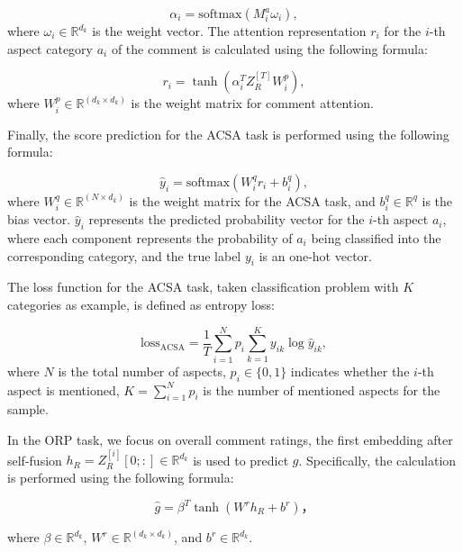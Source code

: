\documentclass[preprint,12pt]{elsarticle}
\begin{document}
\begin{equation}
\alpha_i = \text{softmax}(M_i^a \omega_i),
\end{equation}
where $\omega_i \in \mathbb{R}^{d_k}$ is the weight vector. The attention representation $r_i$ for the $i$-th aspect category $a_i$ of the comment is calculated using the following formula:

\begin{equation}
r_i = \tanh\left(\alpha_i^T Z_R^{[T]} W_i^p\right),
\end{equation}
where $W_i^p \in \mathbb{R}^{(d_k \times d_k)}$ is the weight matrix for comment attention.

Finally, the score prediction for the ACSA task is performed using the following formula:

\begin{equation}
\hat{y}_i = \text{softmax}(W_i^q r_i + b_i^q),
\end{equation}
where $W_i^q \in \mathbb{R}^{(N \times d_k)}$ is the weight matrix for the ACSA task, and $b_i^q \in \mathbb{R}^q$ is the bias vector. $\hat{y}_i$ represents the predicted probability vector for the $i$-th aspect $a_i$, where each component represents the probability of \(a_i\) being classified into the corresponding category, and the true label $y_i$ is an one-hot vector.   

The loss function for the ACSA task, taken classification problem with $K$ categories as example, is defined as entropy loss:

\begin{equation}
\text{loss}_{\text{ACSA}} = \frac{1}{T} \sum_{i=1}^N p_i \sum_{k=1}^{K} y_{ik} \log \hat{y}_{ik},
\end{equation}
where $N$ is the total number of aspects, $p_i \in \{0,1\}$ indicates whether the $i$-th aspect is mentioned, $K = \sum^N_{i=1}p_i$ is the number of mentioned aspects for the sample.


In the ORP task, we focus on overall comment ratings, the first embedding after self-fusion $h_R = Z_R^{[i]} [0;:] \in \mathbb{R}^{d_k}$ is used to predict $g$. Specifically, the calculation is performed using the following formula:

\begin{equation}
\hat{g} = \beta^T \tanh(W^r h_R + b^r)，
\end{equation}

where $\beta \in \mathbb{R}^{d_k}$, $W^r \in \mathbb{R}^{(d_k \times d_k)}$, and $b^r \in \mathbb{R}^{d_k}$.
\end{document}
